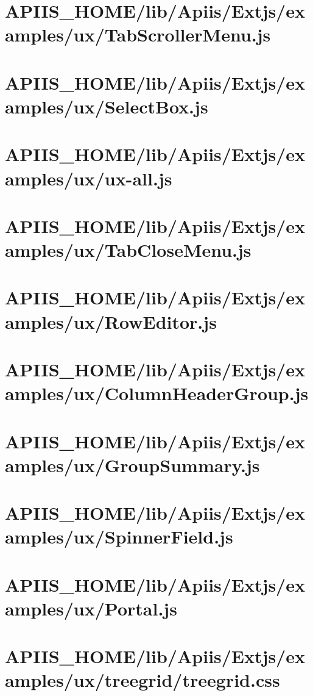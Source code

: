 \section{APIIS\_HOME/lib/Apiis/Extjs/examples/ux/TabScrollerMenu.js} 
\section{APIIS\_HOME/lib/Apiis/Extjs/examples/ux/SelectBox.js} 
\section{APIIS\_HOME/lib/Apiis/Extjs/examples/ux/ux-all.js} 
\section{APIIS\_HOME/lib/Apiis/Extjs/examples/ux/TabCloseMenu.js} 
\section{APIIS\_HOME/lib/Apiis/Extjs/examples/ux/RowEditor.js} 
\section{APIIS\_HOME/lib/Apiis/Extjs/examples/ux/ColumnHeaderGroup.js} 
\section{APIIS\_HOME/lib/Apiis/Extjs/examples/ux/GroupSummary.js} 
\section{APIIS\_HOME/lib/Apiis/Extjs/examples/ux/SpinnerField.js} 
\section{APIIS\_HOME/lib/Apiis/Extjs/examples/ux/Portal.js} 
\section{APIIS\_HOME/lib/Apiis/Extjs/examples/ux/treegrid/treegrid.css} 

